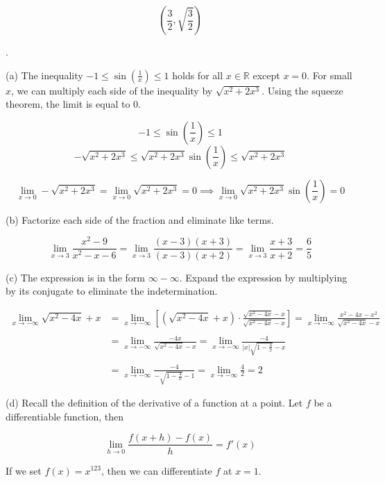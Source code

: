 \documentclass{article}
\begin{document}
\[\boxed{\left(\frac32,\sqrt{\frac32}\right)}\]

\newpage

.

\hfill

\noindent (a) The inequality $\displaystyle-1 \leq \sin\left(\frac1x\right)\leq1$ holds for all $x\in\mathbb{R}$ except $x=0$. For small $x$, we can multiply each side of the inequality by $\sqrt{x^2+2x^3}$. Using the squeeze theorem, the limit is equal to $0$.

\[-1\leq\sin\left(\frac1x\right)\leq1\]
\[-\sqrt{x^2+2x^3}\leq\sqrt{x^2+2x^3}\sin\left(\frac1x\right)\leq\sqrt{x^2+2x^3}\]

\[\lim_{x\to0}-\sqrt{x^2+2x^3}=\lim_{x\to0}\sqrt{x^2+2x^3}=0\implies\lim_{x\to0}\sqrt{x^2+2x^3}\sin\left(\frac1x\right)=\boxed0\]

\hfill

\noindent (b) Factorize each side of the fraction and eliminate like terms.

\[\lim_{x\to3}\frac{x^2-9}{x^2-x-6}=\lim_{x\to3}\frac{(x-3)(x+3)}{(x-3)(x+2)}=\lim_{x\to3}\frac{x+3}{x+2}=\boxed{\frac65}\]

\hfill

\noindent (c) The expression is in the form $\infty-\infty$. Expand the expression by multiplying by its conjugate to eliminate the indetermination.

\begin{align*}
\lim_{x\to-\infty}\sqrt{x^2-4x}+x&=\lim_{x\to-\infty}\left[\left(\sqrt{x^2-4x} + x\right) \cdot\frac{\sqrt{x^2-4x}-x}{\sqrt{x^2-4x}-x}\right]=\lim_{x\to-\infty}\frac{x^2-4x-x^2}{\sqrt{x^2-4x}-x}\\\\&=\lim_{x\to-\infty}\frac{-4x}{\sqrt{x^2-4x}-x}=\lim_{x\to-\infty}\frac{-4}{\displaystyle |x|\sqrt{1-\frac4x}-x}\\\\&=\lim_{x\to-\infty}\frac{-4}{\displaystyle-\sqrt{1-\frac4x}-1}=\lim_{x\to-\infty}\frac42=\boxed{2}\end{align*}

\hfill

\noindent (d) Recall the definition of the derivative of a function at a point. Let $f$ be a differentiable function, then

\[\lim_{h\to 0} \frac{f(x+h)-f(x)}{h} = f'(x)\]

\hfill

\noindent If we set $f(x) = x^{123}$, then we can differentiate $f$ at $x=1$.
\end{document}

